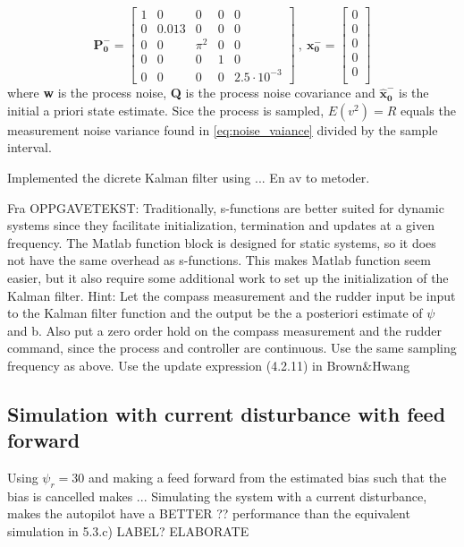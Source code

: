 \begin{equation}
    \boldsymbol{P_0^-} = \begin{bmatrix}
        1 & 0 & 0 & 0 & 0 \\
        0 & 0.013 & 0 & 0 & 0 \\
        0 & 0 & \pi^2 & 0 & 0 \\
        0 & 0 & 0 & 1 & 0 \\
        0 & 0 & 0 & 0 & 2.5 \cdot 10^{-3} 
    \end{bmatrix} \ , \ \boldsymbol{x_0^-} = \begin{bmatrix}
        0 \\ 0 \\ 0 \\ 0 \\ 0 \\
    \end{bmatrix}
\end{equation}
where \textbf{w} is the process noise, \textbf{Q} is the process noise covariance and $\boldsymbol{\hat{x}_0^-}$ is the initial a priori state estimate. Sice the process is sampled, $E(v^2) = R$ equals the measurement noise variance found in \cref{eq:noise_vaiance} divided by the sample interval. 
\newline

Implemented the dicrete Kalman filter using ... En av to metoder. \newline

Fra OPPGAVETEKST: Traditionally, s-functions are better suited for dynamic systems since they facilitate initialization, termination and updates at a given frequency. The Matlab function block is designed for static systems, so it does not have the same overhead as s-functions. This makes Matlab function seem easier, but it also require some additional work to set up the initialization of the Kalman filter. Hint: Let the compass measurement and the rudder input be input to the Kalman filter function and the output be the a posteriori estimate of $\psi$ and b. Also put a zero order hold on the compass measurement and the rudder command, since the process and controller are continuous. Use the same sampling frequency as above. Use the update expression (4.2.11) in Brown\&Hwang 


\subsection{Simulation with current disturbance with feed forward}
Using $\psi_r = 30$ and making a feed forward from the estimated bias such that the bias is cancelled makes ... Simulating the system with a current disturbance, makes the autopilot have a BETTER ?? performance than the equivalent simulation in 5.3.c) LABEL? ELABORATE
\newline

